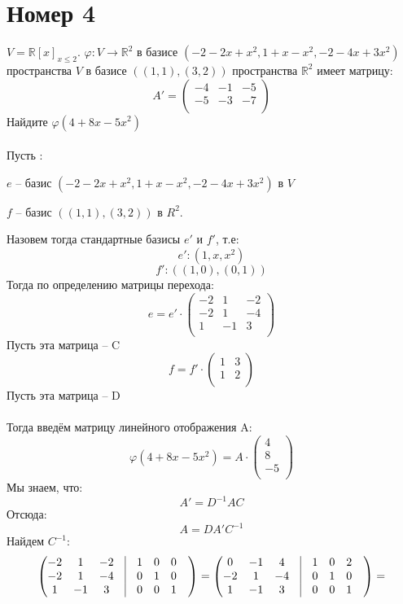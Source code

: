 \documentclass[a4paper,12pt]{article}
\begin{document}
\section*{Номер 4}
$V = \mathbb{R}[x]_{x\leq 2}$. $\varphi : V \rightarrow \mathbb{R}^2$ в базисе $(-2 -2x +x^2, 1 + x - x^2, -2 -4x + 3x^2)$ пространства $V$ в базисе $((1,1), (3,2))$ пространства $\mathbb{R}^2$ имеет матрицу:
\[
A' = 
\begin{pmatrix}
-4 & -1 & -5 \\
-5 & -3 & -7\\
\end{pmatrix}
\]
Найдите $\varphi (4+8x - 5x^2)$  
\\\\
Пусть :
\begin{center}
$e$ -- базис $(-2 -2x +x^2, 1 + x - x^2, -2 -4x + 3x^2)$ в $V$
\end{center} 
\begin{center}$f$ -- базис $((1,1), (3,2))$ в $R^2$.  \end{center}
Назовем тогда стандартные базисы  $e'$ и $f'$, т.е:
\[
e':(1, x, x^2)
\]
\[
f':
\left((1,0), (0, 1)\right)
\]
Тогда по определению матрицы перехода:
\[
e= e' \cdot \begin{pmatrix}
-2 & 1  & -2 \\
-2 & 1 & -4\\
1 & -1 & 3 \\
\end{pmatrix}
\]
Пусть эта матрица -- C
\[
f = f' \cdot \begin{pmatrix}
1 & 3 \\1 & 2\\
\end{pmatrix}
\]
Пусть эта матрица -- D
\\\\
Тогда введём матрицу линейного отображения A:
\[
\varphi(4+8x -5x^2) = A \cdot \begin{pmatrix}
4 \\
8 \\
-5\\
\end{pmatrix}
\]
Мы знаем, что:
\[
A' = D^{-1} AC
\]
Отсюда:
\[
A = DA'C^{-1}
\]
Найдем $C^{-1}$:
\[
\begin{pmatrix}
-2 & 1 & -2 & \vrule &1 & 0 & 0 & \\
-2 & 1 & -4 & \vrule &0 & 1 & 0 & \\
1 & -1 & 3 & \vrule &0 & 0 & 1 & \\
\end{pmatrix}
=
\begin{pmatrix}
0 & -1 & 4 & \vrule &1 & 0 & 2 & \\
-2 & 1 & -4 & \vrule &0 & 1 & 0 & \\
1 & -1 & 3 & \vrule &0 & 0 & 1 & \\
\end{pmatrix}
=
\]
\end{document}
